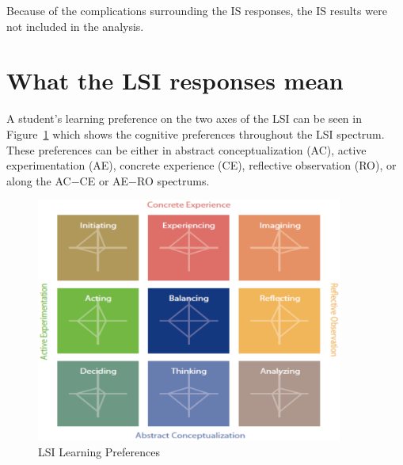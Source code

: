 Because of the complications surrounding the IS responses, the IS results were not included in the analysis.

\section{What the LSI responses mean}
A student's learning preference on the two axes of the LSI can be seen in Figure~\ref{fig:learning-preferences} which shows the cognitive preferences throughout the LSI spectrum. These preferences can be either in abstract conceptualization (AC), active experimentation (AE), concrete experience (CE), reflective observation (RO), or along the AC$-$CE or AE$-$RO spectrums.

\begin{figure}[h!]
  \centering
  \includegraphics[width=0.9\textwidth]{figures/chapter4/learning-preferences.png}
  \caption{LSI Learning Preferences}
  \label{fig:learning-preferences}
\end{figure}

